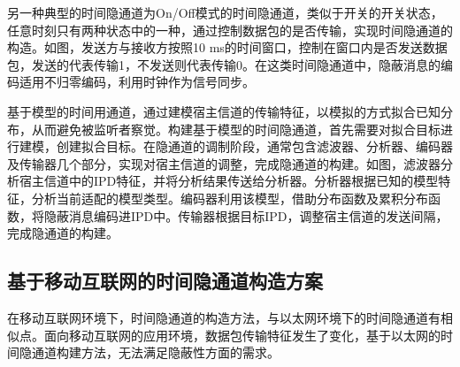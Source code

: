 另一种典型的时间隐通道为On/Off模式的时间隐通道，类似于开关的开关状态，任意时刻只有两种状态中的一种，通过控制数据包的是否传输，实现时间隐通道的构造。如图，发送方与接收方按照10 ms的时间窗口，控制在窗口内是否发送数据包，发送的代表传输1，不发送则代表传输0。在这类时间隐通道中，隐蔽消息的编码适用不归零编码，利用时钟作为信号同步。

基于模型的时间用通道，通过建模宿主信道的传输特征，以模拟的方式拟合已知分布，从而避免被监听者察觉。构建基于模型的时间隐通道，首先需要对拟合目标进行建模，创建拟合目标。在隐通道的调制阶段，通常包含滤波器、分析器、编码器及传输器几个部分，实现对宿主信道的调整，完成隐通道的构建。如图，滤波器分析宿主信道中的IPD特征，并将分析结果传送给分析器。分析器根据已知的模型特征，分析当前适配的模型类型。编码器利用该模型，借助分布函数及累积分布函数，将隐蔽消息编码进IPD中。传输器根据目标IPD，调整宿主信道的发送间隔，完成隐通道的构建。

\subsection{基于移动互联网的时间隐通道构造方案}
\label{chap:backinfo:ctc:mobile}
在移动互联网环境下，时间隐通道的构造方法，与以太网环境下的时间隐通道有相似点。面向移动互联网的应用环境，数据包传输特征发生了变化，基于以太网的时间隐通道构建方法，无法满足隐蔽性方面的需求。

